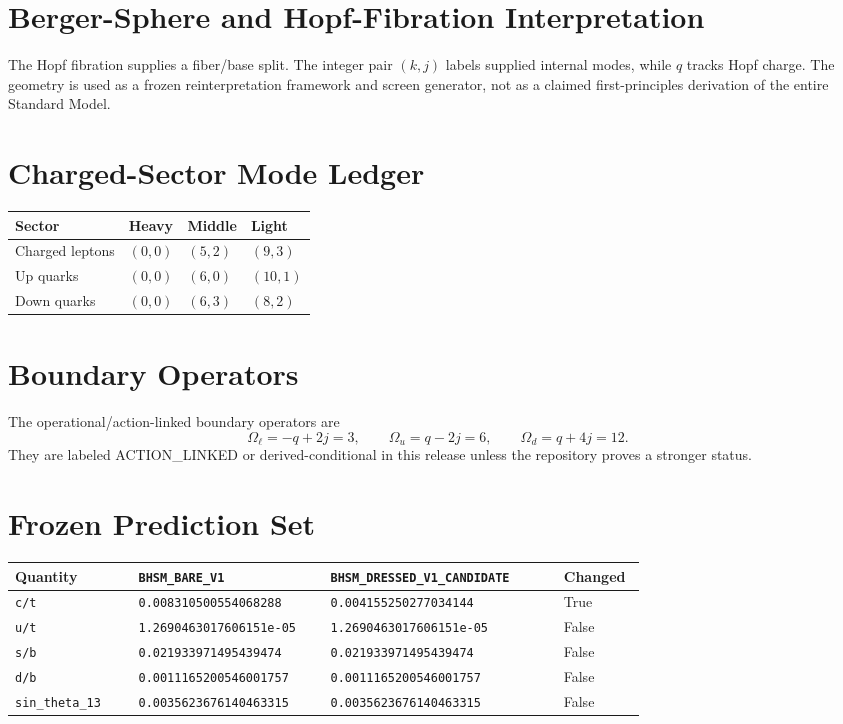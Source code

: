 \documentclass[11pt]{article}
\begin{document}
\section{Berger-Sphere and Hopf-Fibration Interpretation}
The Hopf fibration supplies a fiber/base split. The integer pair \((k,j)\) labels supplied internal modes, while \(q\) tracks Hopf charge. The geometry is used as a frozen reinterpretation framework and screen generator, not as a claimed first-principles derivation of the entire Standard Model.

\section{Charged-Sector Mode Ledger}
\begin{center}
\begin{tabular}{llll}
\toprule
Sector & Heavy & Middle & Light\\
\midrule
Charged leptons & \((0,0)\) & \((5,2)\) & \((9,3)\)\\
Up quarks & \((0,0)\) & \((6,0)\) & \((10,1)\)\\
Down quarks & \((0,0)\) & \((6,3)\) & \((8,2)\)\\
\bottomrule
\end{tabular}
\end{center}

\section{Boundary Operators}
The operational/action-linked boundary operators are
\[
\Omega_\ell=-q+2j=3,\qquad
\Omega_u=q-2j=6,\qquad
\Omega_d=q+4j=12.
\]
They are labeled ACTION\_LINKED or derived-conditional in this release unless the repository proves a stronger status.

\section{Frozen Prediction Set}
\begin{longtable}{p{0.18\linewidth}p{0.28\linewidth}p{0.34\linewidth}p{0.12\linewidth}}
\toprule
Quantity & \texttt{BHSM\_BARE\_V1} & \texttt{BHSM\_DRESSED\_V1\_CANDIDATE} & Changed\\
\midrule
\endhead
\texttt{c/t} & \texttt{0.008310500554068288} & \texttt{0.004155250277034144} & True\\
\texttt{u/t} & \texttt{1.2690463017606151e-05} & \texttt{1.2690463017606151e-05} & False\\
\texttt{s/b} & \texttt{0.021933971495439474} & \texttt{0.021933971495439474} & False\\
\texttt{d/b} & \texttt{0.0011165200546001757} & \texttt{0.0011165200546001757} & False\\
\texttt{sin\_theta\_13} & \texttt{0.0035623676140463315} & \texttt{0.0035623676140463315} & False\\
\bottomrule
\end{longtable}
\end{document}

